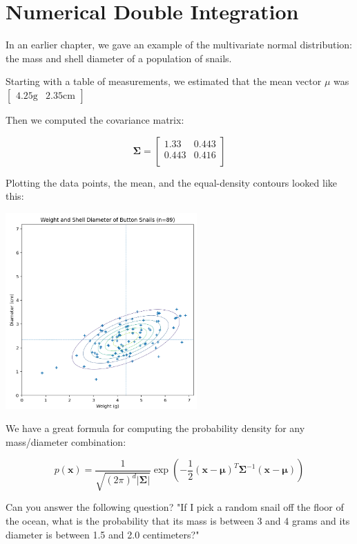 \chapter{Numerical Double Integration}

In an earlier chapter, we gave an example of the multivariate normal distribution: the mass and shell diameter of a population of snails.

Starting with a table of measurements, we estimated that the mean vector $\mu$ was $\begin{bmatrix}4.25 \text{g} & 2.35 \text{cm}\end{bmatrix}$

Then we computed the covariance matrix:

\begin{equation*}
\mathbf{\Sigma} = \begin{bmatrix}
1.33 &  0.443 \\
0.443 & 0.416 \\
\end{bmatrix}
\end{equation*}

Plotting the data points, the mean, and the equal-density contours looked like this:

\includegraphics[width=0.55\textwidth]{contour.png}

We have a great formula for computing the probability density for any mass/diameter combination:

\begin{equation*}
p(\mathbf{x}) = \frac{1}{\sqrt{(2\pi)^d|\mathbf{\Sigma}|}}\exp\left(-\frac{1}{2}(\mathbf{x}-\boldsymbol\mu)^T\mathbf{\Sigma}^{-1}(\mathbf{x}-\boldsymbol\mu)\right)
\end{equation*}

Can you answer the following question? "If I pick a random snail off the floor of the ocean, what is the probability that its mass is between 3 and 4 grams
and its diameter is between 1.5 and 2.0 centimeters?"

